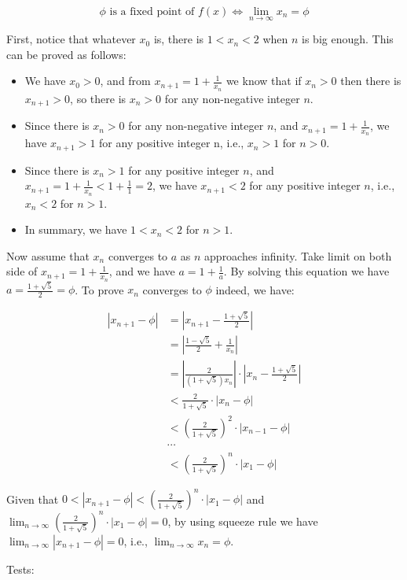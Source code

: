 \documentclass[../main.tex]{subfiles}
\begin{document}
$$
\phi\text{ is a fixed point of }f(x)\iff\lim_{n\to\infty}x_n=\phi
$$

First, notice that whatever $x_0$ is, there is
 $1<x_n<2$ when $n$ is big enough. This can be
 proved as follows:

\begin{itemize}
\item We have $x_0 > 0$, and from $x_{n+1}=1+\frac{1}{x_n}$ we
 know that if $x_n > 0$ then there is $x_{n+1} > 0$, so there is
 $x_n > 0$ for any non-negative integer $n$.
\item Since there is $x_n > 0$ for any non-negative integer $n$,
 and $x_{n+1}=1+\frac{1}{x_n}$, we have $x_{n+1} > 1$ for any
 positive integer n, i.e., $x_n > 1$ for $n > 0$.
\item Since there is $x_n > 1$ for any positive integer $n$,
 and $x_{n+1}=1+\frac{1}{x_n} < 1+\frac{1}{1} = 2$, we have
 $x_{n+1} < 2$ for any positive integer $n$, i.e., $x_n < 2$ for
 $n > 1$.
\item In summary, we have $1 < x_n < 2$ for $n > 1$.
\end{itemize}

Now assume that $x_n$ converges to $a$ as $n$ approaches infinity.
 Take limit on both side of $x_{n+1}=1+\frac{1}{x_n}$, and we have
 $a=1+\frac{1}{a}$. By solving this equation we have
 $a=\frac{1+\sqrt{5}}{2}=\phi$. To prove $x_n$ converges to $\phi$ indeed,
 we have:

\begin{align*}
|x_{n+1}-\phi| &= \left|x_{n+1}-\frac{1+\sqrt{5}}{2}\right| \\
&= \left|\frac{1-\sqrt{5}}{2}+\frac{1}{x_n}\right| \\
&= \left|\frac{2}{(1+\sqrt{5})x_n}\right|\cdot\left|x_n - \frac{1+\sqrt{5}}{2}\right| \\
&< \frac{2}{1+\sqrt{5}}\cdot|x_n - \phi| \\
&< \left(\frac{2}{1+\sqrt{5}}\right)^2\cdot|x_{n-1} - \phi| \\
&\cdots \\
&< \left(\frac{2}{1+\sqrt{5}}\right)^n\cdot|x_1 - \phi|
\end{align*}

Given that $0<|x_{n+1}-\phi|<\left(\frac{2}{1+\sqrt{5}}\right)^n\cdot|x_1 - \phi|$ and $\lim_{n\to\infty}\left(\frac{2}{1+\sqrt{5}}\right)^n\cdot|x_1 - \phi|=0$, by using squeeze rule we have $\lim_{n\to\infty}|x_{n+1}-\phi|=0$, i.e., $\lim_{n\to\infty}x_n=\phi$.

Tests:
\end{document}
